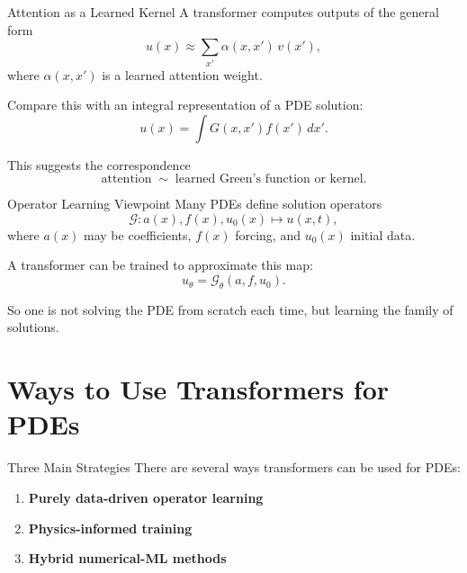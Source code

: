 \documentclass{beamer}
\begin{document}

\begin{frame}{Attention as a Learned Kernel}
A transformer computes outputs of the general form
\[
u(x) \approx \sum_{x'} \alpha(x,x')\, v(x'),
\]
where \(\alpha(x,x')\) is a learned attention weight.

\medskip

Compare this with an integral representation of a PDE solution:
\[
u(x) = \int G(x,x') f(x')\,dx'.
\]

This suggests the correspondence
\[
\boxed{\text{attention} \;\sim\; \text{learned Green's function or kernel}.}
\]
\end{frame}


\begin{frame}{Operator Learning Viewpoint}
Many PDEs define solution operators
\[
\mathcal{G} : a(x), f(x), u_0(x) \mapsto u(x,t),
\]
where \(a(x)\) may be coefficients, \(f(x)\) forcing, and \(u_0(x)\) initial data.

\medskip

A transformer can be trained to approximate this map:
\[
u_\theta = \mathcal{G}_\theta(a,f,u_0).
\]

So one is not solving the PDE from scratch each time, but learning the family of solutions.
\end{frame}

\section{Ways to Use Transformers for PDEs}

\begin{frame}{Three Main Strategies}
There are several ways transformers can be used for PDEs:

\begin{enumerate}
\item \textbf{Purely data-driven operator learning}
\item \textbf{Physics-informed training}
\item \textbf{Hybrid numerical-ML methods}
\end{enumerate}
\end{frame}

\end{document}
